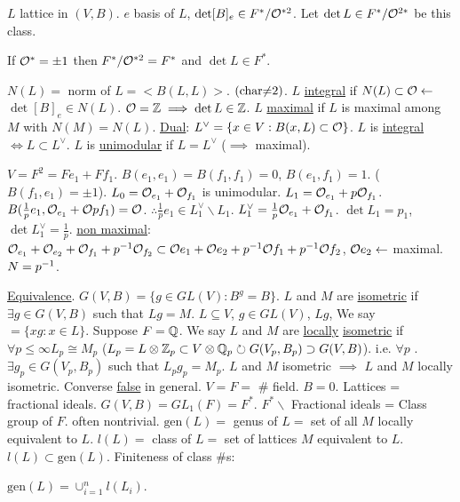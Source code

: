\documentclass[]{article}
\begin{document}
$L$ lattice in $(V,B)$. $e$ basis of $L$, $\det[B]_e\in F^*/\mathcal{O}^{*2}$. Let $\det L\in F^*/\mathcal{O}^{2*}$ be this class.

\begin{remark}
	If $\mathcal{O}^* = \pm 1$ then $F^*/\mathcal{O}^{*2} = F^*$ and $\det L\in F^*$.
\end{remark}

$N(L) = $ norm of $L = <B(L,L)>$. $(\text{char}\mathcal{\neq} 2)$. $L$ \ul{integral} if $N(L)\subset \mathcal{O}\leftarrow$ $\det[B]_e\in N(L)$. $\mathcal{O} = \mathbb{Z} \implies \det L \in \mathbb{Z}$. $L$ \ul{maximal} if $L$ is maximal among $M$ with $N(M) = N(L)$. \ul{Dual}: $L^\vee = \{x\in V: B(x,L)\subset \mathcal{O}\}$. $L$ is \ul{integral} $\iff L\subset L^\vee$. $L$ is \ul{unimodular} if $L = L^\vee$ ($\implies$ maximal).

\begin{example}
	$V = F^2 = Fe_1 + Ff_1$. $B(e_1,e_1) = B(f_1,f_1) = 0$, $B(e_1,f_1) = 1$. ($B(f_1,e_1) = \pm 1$). $L_0 = \mathcal{O}_{e_1} + \mathcal{O}_{f_1}$ is unimodular. $L_1 = \mathcal{O}_{e_1} + p\mathcal{O}_{f_1}$. $B(\frac{1}{p}e_1,\mathcal{O}_{e_1}+\mathcal{O}pf_1) = \mathcal{O}$. $\therefore \frac{1}{p}e_1 \in L_1^\vee\backslash L_1$. $L_1^\vee = \frac{1}{p} \mathcal{O}_{e_1} + \mathcal{O}_{f_1}$. $\det L_1 = p_1$, $\det L_1^\vee = \frac{1}{p}$. \ul{non maximal}: $\mathcal{O}_{e_1} + \mathcal{O}_{e_2} + \mathcal{O}_{f_1} + p^{-1} \mathcal{O}_{f_2}\subset \mathcal{O}e_1+\mathcal{O}e_2 + p^{-1} \mathcal{O}f_1 + p^{-1} \mathcal{O}f_2$, $\mathcal{O}e_2 \leftarrow$ maximal. \ul{$N = p^{-1}$}.
\end{example}

\ul{Equivalence}. $G(V,B) = \{g\in GL(V) : B^g = B\}$.
$L$ and $M$ are \ul{isometric} if $\exists g\in G(V,B)$ such that $Lg = M$. $L\subseteq V$, $g\in GL(V)$, $Lg$, We say $ = \{xg:x\in L\}$. Suppose $F = \mathbb{Q}$. We say $L$ and $M$ are \ul{locally} \ul{isometric} if $\forall p\leq \infty L_p \cong M_p$ ($L_p = L\otimes \mathbb{Z}_p\subset V\otimes \mathbb{Q}_p \circlearrowright G(V_p,B_p)\supset G(V,B)$). i.e. $\forall p$ .$\exists g_p\in G(V_p,B_p)$ such that $L_pg_p = M_p$. $L$ and $M$ isometric $\implies $ $L$ and $M$ locally isometric. Converse \ul{false} in general. $V = F = $ \# field. $B = 0$.
Lattices = fractional ideals. $G(V,B) = GL_1(F) = F^*$. $F^*\backslash$ Fractional ideals = Class group of $F$. often nontrivial.
$\text{gen}(L) = $ genus of $L = $ set of all $M$ locally equivalent to $L$. $l(L) = $ class of $L = $ set of lattices $M$ equivalent to $L$. $l(L) \subset \text{gen}(L)$.
Finiteness of class $\#$s:

\begin{theorem}
	$\text{gen}(L) = \cup_{i=1}^n l(L_i)$.
\end{theorem}
\end{document}
